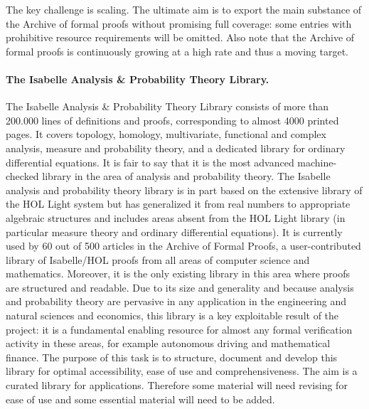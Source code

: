 The key challenge is scaling. The ultimate aim is to export the main
substance of the Archive of formal proofs without promising full coverage: some entries
with prohibitive resource requirements will be omitted. Also note that
the Archive of formal proofs is continuously growing at a high rate and thus a moving
target.

\paragraph*{The Isabelle Analysis \& Probability Theory Library.}
The Isabelle Analysis \& Probability Theory Library consists of more
than 200.000 lines of definitions and proofs, corresponding to almost
4000 printed pages. It covers topology, homology, multivariate,
functional and complex analysis, measure and probability theory, and a
dedicated library for ordinary differential equations. It is fair to
say that it is the most advanced machine-checked library in the area
of analysis and probability theory. The Isabelle analysis and
probability theory library is in part based on the extensive library
of the HOL Light system but has generalized it from real numbers to
appropriate algebraic structures and includes areas absent from the
HOL Light library (in particular measure theory and ordinary
differential equations). It is currently used by 60 out of 500
articles in the Archive of Formal Proofs, a user-contributed library
of Isabelle/HOL proofs from all areas of computer science and
mathematics. Moreover, it is the only existing library in this area
where proofs are structured and readable. Due to its size and
generality and because analysis and probability theory are pervasive
in any application in the engineering and natural sciences and
economics, this library is a key exploitable result of the project: it
is a fundamental enabling resource for almost any formal verification
activity in these areas, for example autonomous driving and
mathematical finance. The purpose of this task is to structure,
document and develop this library for optimal accessibility, ease of
use and comprehensiveness. The aim is a curated library for
applications.  Therefore some material will need revising for ease of
use and some essential material will need to be added.

